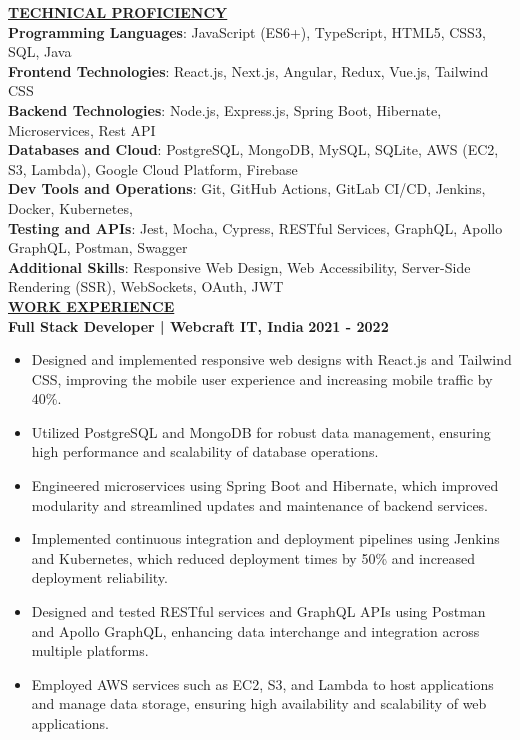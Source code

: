 \documentclass{article}
\begin{document}
\noindent \textbf{\underline{TECHNICAL PROFICIENCY}} \\
\textbf{Programming Languages}{: \small JavaScript (ES6+), TypeScript, HTML5, CSS3, SQL, Java} \\
\textbf{Frontend Technologies}{: \small React.js, Next.js, Angular, Redux, Vue.js, Tailwind CSS} \\
\textbf{Backend Technologies}{: \small Node.js, Express.js, Spring Boot, Hibernate, Microservices, Rest API} \\
\textbf{Databases and Cloud}{: \small PostgreSQL, MongoDB, MySQL, SQLite, AWS (EC2, S3, Lambda), Google Cloud Platform, Firebase} \\
\textbf{Dev Tools and Operations}{: \small Git, GitHub Actions, GitLab CI/CD, Jenkins, Docker, Kubernetes,} \\
\textbf{Testing and APIs}{: \small Jest, Mocha, Cypress, RESTful Services, GraphQL, Apollo GraphQL, Postman, Swagger} \\
\textbf{Additional Skills}{: \small Responsive Web Design, Web Accessibility, Server-Side Rendering (SSR), WebSockets, OAuth, JWT} \\


\noindent \textbf{\underline{WORK EXPERIENCE}}\\
\noindent \textbf{Full Stack Developer | Webcraft IT, India} \hfill \textbf{2021 - 2022}
\begin{itemize}[noitemsep,nolistsep,leftmargin=*]
\item {\small Designed and implemented responsive web designs with React.js and Tailwind CSS, improving the mobile user experience and increasing mobile traffic by 40\%.}
\item {\small Utilized PostgreSQL and MongoDB for robust data management, ensuring high performance and scalability of database operations.}
\item {\small Engineered microservices using Spring Boot and Hibernate, which improved modularity and streamlined updates and maintenance of backend services.}
\item {\small Implemented continuous integration and deployment pipelines using Jenkins and Kubernetes, which reduced deployment times by 50\% and increased deployment reliability.}
\item {\small Designed and tested RESTful services and GraphQL APIs using Postman and Apollo GraphQL, enhancing data interchange and integration across multiple platforms.}
\item {\small Employed AWS services such as EC2, S3, and Lambda to host applications and manage data storage, ensuring high availability and scalability of web applications.}\\
\end{itemize}
\end{document}
